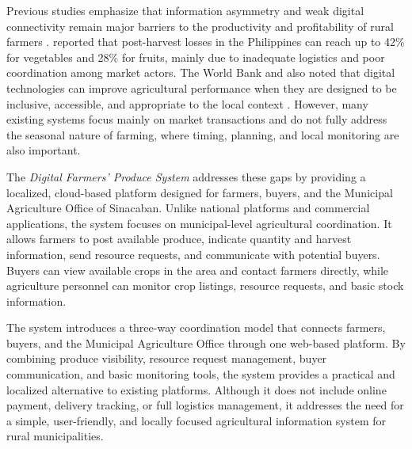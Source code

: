 Previous studies emphasize that information asymmetry and weak digital connectivity remain major barriers to the productivity and profitability of rural farmers \citep{Briones2023}. \citet{Mopera2016} reported that post-harvest losses in the Philippines can reach up to 42\% for vegetables and 28\% for fruits, mainly due to inadequate logistics and poor coordination among market actors. The World Bank and \citet{Qiang2012} also noted that digital technologies can improve agricultural performance when they are designed to be inclusive, accessible, and appropriate to the local context \citep{WorldBank2013}. However, many existing systems focus mainly on market transactions and do not fully address the seasonal nature of farming, where timing, planning, and local monitoring are also important.

The \textit{Digital Farmers' Produce System} addresses these gaps by providing a localized, cloud-based platform designed for farmers, buyers, and the Municipal Agriculture Office of Sinacaban. Unlike national platforms and commercial applications, the system focuses on municipal-level agricultural coordination. It allows farmers to post available produce, indicate quantity and harvest information, send resource requests, and communicate with potential buyers. Buyers can view available crops in the area and contact farmers directly, while agriculture personnel can monitor crop listings, resource requests, and basic stock information.

The system introduces a three-way coordination model that connects farmers, buyers, and the Municipal Agriculture Office through one web-based platform. By combining produce visibility, resource request management, buyer communication, and basic monitoring tools, the system provides a practical and localized alternative to existing platforms. Although it does not include online payment, delivery tracking, or full logistics management, it addresses the need for a simple, user-friendly, and locally focused agricultural information system for rural municipalities.

